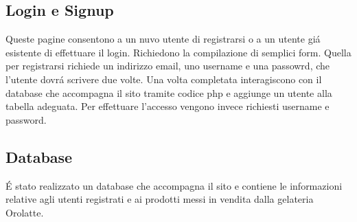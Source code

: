 	\subsection{Login e Signup}
		Queste pagine consentono a un nuvo utente di registrarsi o a un utente gi\'a esistente di effettuare il login.
		Richiedono la compilazione di semplici form.
		Quella per registrarsi richiede un indirizzo email, uno username e una passowrd, che l'utente dovr\'a scrivere due volte.
		Una volta completata interagiscono con il database che accompagna il sito tramite codice php e aggiunge un utente alla tabella adeguata.
		Per effettuare l'accesso vengono invece richiesti username e password.
	\subsection{Database}
		\'E stato realizzato un database che accompagna il sito e contiene le informazioni relative agli utenti registrati e ai prodotti messi in vendita dalla gelateria Orolatte.
